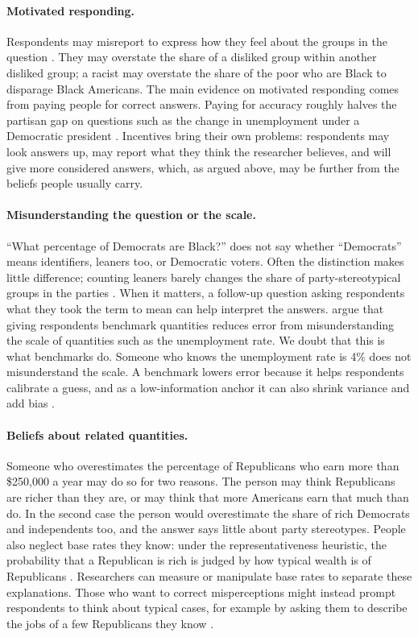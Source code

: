 \documentclass[11pt]{article}
\begin{document}
\paragraph{Motivated responding.} Respondents may misreport to express how they feel about the groups in the question \citep{bullock2015, prior2015}. They may overstate the share of a disliked group within another disliked group; a racist may overstate the share of the poor who are Black to disparage Black Americans. The main evidence on motivated responding comes from paying people for correct answers. Paying for accuracy roughly halves the partisan gap on questions such as the change in unemployment under a Democratic president \citep{prior2015, bullock2015}. Incentives bring their own problems: respondents may look answers up, may report what they think the researcher believes, and will give more considered answers, which, as argued above, may be further from the beliefs people usually carry.

\paragraph{Misunderstanding the question or the scale.} ``What percentage of Democrats are Black?'' does not say whether ``Democrats'' means identifiers, leaners too, or Democratic voters. Often the distinction makes little difference; counting leaners barely changes the share of party-stereotypical groups in the parties \citep{ahler2018}. When it matters, a follow-up question asking respondents what they took the term to mean can help interpret the answers. \citet{ansolabehere2013} argue that giving respondents benchmark quantities reduces error from misunderstanding the scale of quantities such as the unemployment rate. We doubt that this is what benchmarks do. Someone who knows the unemployment rate is 4\% does not misunderstand the scale. A benchmark lowers error because it helps respondents calibrate a guess, and as a low-information anchor it can also shrink variance and add bias \citep{tversky1974}.

\paragraph{Beliefs about related quantities.} Someone who overestimates the percentage of Republicans who earn more than \$250,000 a year may do so for two reasons. The person may think Republicans are richer than they are, or may think that more Americans earn that much than do. In the second case the person would overestimate the share of rich Democrats and independents too, and the answer says little about party stereotypes. People also neglect base rates they know: under the representativeness heuristic, the probability that a Republican is rich is judged by how typical wealth is of Republicans \citep{kahneman2002}. Researchers can measure or manipulate base rates to separate these explanations. Those who want to correct misperceptions might instead prompt respondents to think about typical cases, for example by asking them to describe the jobs of a few Republicans they know \citep{thorson2014}.
\end{document}
